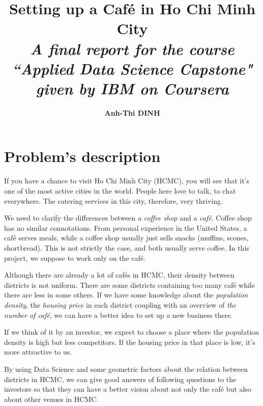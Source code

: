 \documentclass[12pt,a4paper]{article}
\author{\textbf{Anh-Thi DINH}}
\title{\textbf{Setting up a Café in Ho Chi Minh City}\\{\normalsize \textit{A final report for the course ``Applied Data Science Capstone" given by IBM on Coursera}}}
\begin{document}
\maketitle

\tableofcontents

\section{Problem's description}
\label{sec:problem}

If you have a chance to visit Ho Chi Minh City (HCMC), you will see that it's one of the most active cities in the world. People here love to talk, to chat everywhere. The catering services in this city, therefore, very thriving. 

We need to clarify the differences between a \textit{coffee shop} and a \textit{café}. Coffee shop has no similar connotations. From personal experience in the United States, a café serves meals, while a coffee shop usually just sells snacks (muffins, scones, shortbread). This is not strictly the case, and both usually serve coffee. In this project, we suppose to work only on the café.

Although there are already a lot of cafés in HCMC, their density between districts is not uniform. There are some districts containing too many café while there are less in some others. If we have some knowledge about the \textit{population density}, the \textit{housing price} in each district coupling with an overview of \textit{the number of café}, we can have a better idea to set up a new business there.

If we think of it by an investor, we expect to choose a place where the population density is high but less competitors. If the housing price in that place is low, it's more attractive to us.

By using Data Science and some geometric factors about the relation between districts in HCMC, we can give good answers of following questions to the investors so that they can have a better vision about not only the café but also about other venues in HCMC.
\end{document}
